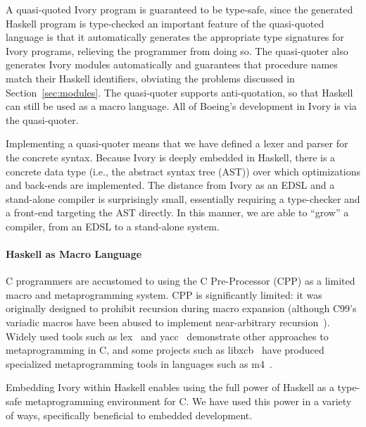 A quasi-quoted Ivory program is guaranteed to be type-safe, since the generated
Haskell program is type-checked an important feature of the quasi-quoted
language is that it automatically generates the appropriate type signatures for
Ivory programs, relieving the programmer from doing so. The quasi-quoter also
generates Ivory modules automatically and guarantees that procedure names match
their Haskell identifiers, obviating the problems discussed in
Section~\ref{sec:modules}. The quasi-quoter supports anti-quotation, so that
Haskell can still be used as a macro language. All of Boeing's development in
Ivory is via the quasi-quoter.

Implementing a quasi-quoter means that we have defined a lexer and parser for
the concrete syntax. Because Ivory is deeply embedded in Haskell, there is a
concrete data type (i.e., the abstract syntax tree (AST)) over which
optimizations and back-ends are implemented. The distance from Ivory as an EDSL
and a stand-alone compiler is surprisingly small, essentially requiring a
type-checker and a front-end targeting the AST directly. In this manner, we are
able to ``grow'' a compiler, from an EDSL to a stand-alone system.


\paragraph{Haskell as Macro Language}
C programmers are accustomed to using the C Pre-Processor (CPP) as a limited
macro and metaprogramming system. CPP is significantly limited: it was
originally designed to prohibit recursion during macro expansion (although
C99's variadic macros have been abused to implement near-arbitrary
recursion~\cite{cpp-turing}). Widely used tools such as lex~\cite{lex} and
yacc~\cite{yacc} demonstrate other approaches to metaprogramming in C, and some
projects such as libxcb~\cite{xcb} have produced specialized metaprogramming
tools in languages such as m4~\cite{m4}.

Embedding Ivory within Haskell enables using the full power of Haskell as a
type-safe metaprogramming environment for C. We have used this power in a
variety of ways, specifically beneficial to embedded development.

